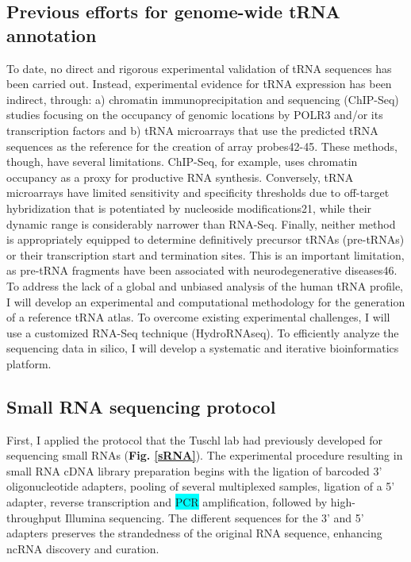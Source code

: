 \documentclass[12pt]{rockefeller}
\newcommand{\cyan}[1]{\colorbox{cyan}{#1}}
\begin{document}
\subsection{Previous efforts for genome-wide tRNA annotation}

To date, no direct and rigorous experimental validation of tRNA sequences has been carried out. Instead, experimental evidence for tRNA expression has been indirect, through: a) chromatin immunoprecipitation and sequencing (ChIP-Seq) studies focusing on the occupancy of genomic locations by POLR3 and/or its transcription factors and b) tRNA microarrays that use the predicted tRNA sequences as the reference for the creation of array probes42-45. These methods, though, have several limitations. ChIP-Seq, for example, uses chromatin occupancy as a proxy for productive RNA synthesis. Conversely, tRNA microarrays have limited sensitivity and specificity thresholds due to off-target hybridization that is potentiated by nucleoside modifications21, while their dynamic range is considerably narrower than RNA-Seq. Finally, neither method is appropriately equipped to determine definitively precursor tRNAs (pre-tRNAs) or their transcription start and termination sites. This is an important limitation, as pre-tRNA fragments have been associated with neurodegenerative diseases46. 
	To address the lack of a global and unbiased analysis of the human tRNA profile, I will develop an experimental and computational methodology for the generation of a reference tRNA atlas. To overcome existing experimental challenges, I will use a customized RNA-Seq technique (HydroRNAseq). To efficiently analyze the sequencing data in silico, I will develop a systematic and iterative bioinformatics platform.


\subsection{Small RNA sequencing protocol}
First, I applied the protocol that the Tuschl lab had previously developed for sequencing small RNAs \cite{Hafner:2012eaa} (\textbf{Fig. \ref{sRNA}}). The experimental procedure resulting in small RNA cDNA library preparation begins with the ligation of barcoded 3' oligonucleotide adapters, pooling of several multiplexed samples, ligation of a 5' adapter, reverse transcription and \cyan{PCR} amplification, followed by high-throughput Illumina sequencing. The different sequences for the 3' and 5' adapters preserves the strandedness of the original RNA sequence, enhancing ncRNA discovery and curation. 
\end{document}
